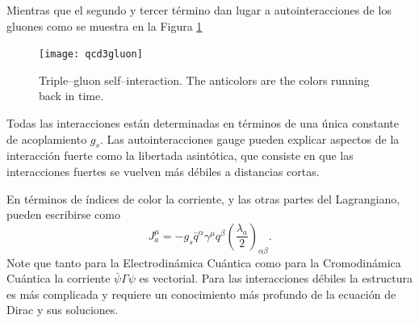 Mientras que el segundo y tercer término dan lugar a autointeracciones de los gluones como se muestra en la Figura \ref{fig:qcd3gluon}
\begin{figure}
  \centering
  \texttt{[image: qcd3gluon]}%
  \caption{Triple--gluon self--interaction. The anticolors are the colors running back in time.}
  \label{fig:qcd3gluon}
\end{figure}


Todas las interacciones están determinadas en términos de una única constante de acoplamiento $g_s$. Las autointeracciones gauge pueden explicar aspectos de la interacción fuerte como la libertada asintótica, que consiste en que las interacciones fuertes se vuelven más débiles a distancias cortas. 

En términos de índices de color la corriente, y las otras partes del Lagrangiano, pueden escribirse como
\begin{equation}
  \label{eq:223qft}
  J^\mu_a=-g_s\bar{q}^\alpha\gamma^\mu q^\beta\left(\frac{\lambda_a}{2}\right)_{\alpha\beta}.
\end{equation}
Note que tanto para la Electrodinámica Cuántica como para la Cromodinámica Cuántica la corriente $\bar{\psi}\Gamma\psi$ es vectorial. Para las interacciones débiles la estructura es más complicada y requiere un conocimiento más profundo de la ecuación de Dirac y sus soluciones.

